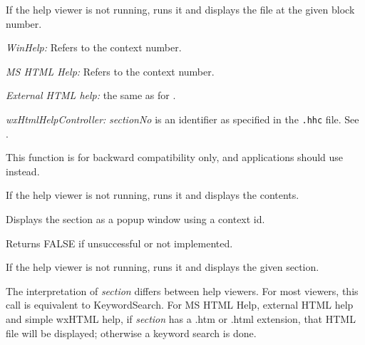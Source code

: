 \label{wxhelpcontrollerdisplayblock}


If the help viewer is not running, runs it and displays the file at the given block number.

{\it WinHelp:} Refers to the context number.

{\it MS HTML Help:} Refers to the context number.

{\it External HTML help:} the same as for .

{\it wxHtmlHelpController:} {\it sectionNo} is an identifier as specified in the {\tt .hhc} file. See .

This function is for backward compatibility only, and applications should use  instead.

\label{wxhelpcontrollerdisplaycontents}


If the help viewer is not running, runs it and displays the
contents.

\label{wxhelpcontrollerdisplaycontextpopup}


Displays the section as a popup window using a context id.

Returns FALSE if unsuccessful or not implemented.

\label{wxhelpcontrollerdisplaysection}


If the help viewer is not running, runs it and displays the given section.

The interpretation of {\it section} differs between help viewers. For most viewers,
this call is equivalent to KeywordSearch. For MS HTML Help, external HTML help
and simple wxHTML help, if {\it section} has a .htm
or .html extension, that HTML file will be displayed; otherwise
a keyword search is done.



